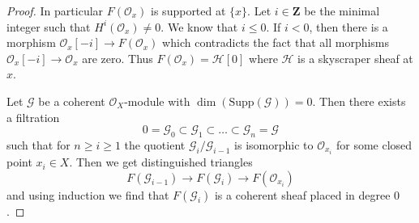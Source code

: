 \begin{proof}
\medskip\noindent
In particular $F(\mathcal{O}_x)$ is supported at $\{x\}$.
Let $i \in \mathbf{Z}$ be the minimal integer such that
$H^i(\mathcal{O}_x) \not = 0$. We know that $i \leq 0$.
If $i < 0$, then there is a morphism
$\mathcal{O}_x[-i] \to F(\mathcal{O}_x)$
which contradicts the fact that all morphisms
$\mathcal{O}_x[-i] \to \mathcal{O}_x$ are zero.
Thus $F(\mathcal{O}_x) = \mathcal{H}[0]$ where
$\mathcal{H}$ is a skyscraper sheaf at $x$.

\medskip\noindent
Let $\mathcal{G}$ be a coherent $\mathcal{O}_X$-module with
$\dim(\text{Supp}(\mathcal{G})) = 0$. Then there exists a
filtration
$$
0 = \mathcal{G}_0 \subset \mathcal{G}_1 \subset \ldots \subset
\mathcal{G}_n = \mathcal{G}
$$
such that for $n \geq i \geq 1$ the quotient $\mathcal{G}_i/\mathcal{G}_{i - 1}$
is isomorphic to $\mathcal{O}_{x_i}$ for some closed point $x_i \in X$.
Then we get distinguished triangles
$$
F(\mathcal{G}_{i - 1}) \to F(\mathcal{G}_i) \to F(\mathcal{O}_{x_i})
$$
and using induction we find that $F(\mathcal{G}_i)$ is a
coherent sheaf placed in degree $0$.


\end{proof}
